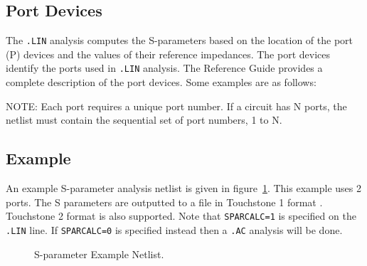 \subsection{Port Devices}
\label{SP_Port}

The \verb|.LIN| analysis computes the S-parameters based on the location of the port (P)
devices and the values of their reference impedances. The port devices identify
the ports used in \verb|.LIN| analysis. The \Xyce{} Reference Guide\ReferenceGuide{} 
provides a complete description of the port devices. Some examples are as follows:


NOTE:  Each port requires a unique port number. If a circuit has N ports, the netlist must
contain the sequential set of port numbers, 1 to N.  	

\subsection{Example}
An example S-parameter analysis netlist is given in figure~\ref{spExample}.  This example uses 2 ports.
The S parameters are outputted to a file in Touchstone 1 format \cite{touchstone2_std_2009}.
Touchstone 2 format is also supported.  Note that \texttt{SPARCALC=1} is specified on
the \texttt{.LIN} line.  If \texttt{SPARCALC=0} is specified instead then a \texttt{.AC}
analysis will be done.

\begin{figure}[htbp]
  \begin{centering}
\caption[S-parameter Example Netlist]
{S-parameter Example Netlist.  \label{spExample} }
\end{centering}
\end{figure}

